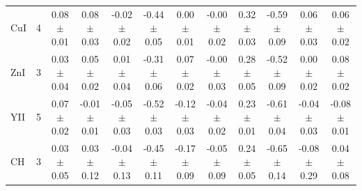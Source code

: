 \documentclass[oneside]{emulateapj}
\begin{document}
\begin{table}
\begin{tabular}{lccccccccccc}
CuI & 4 & 0.08 $\pm$ 0.01 & 0.08 $\pm$ 0.03 & -0.02 $\pm$ 0.02 & -0.44 $\pm$ 0.05 & 0.00 $\pm$ 0.01 & -0.00 $\pm$ 0.02 & 0.32 $\pm$ 0.03 & -0.59 $\pm$ 0.09 & 0.06 $\pm$ 0.03 & 0.06 $\pm$ 0.02 \\
ZnI & 3 & 0.03 $\pm$ 0.04 & 0.05 $\pm$ 0.02 & 0.01 $\pm$ 0.04 & -0.31 $\pm$ 0.06 & 0.07 $\pm$ 0.02 & -0.00 $\pm$ 0.03 & 0.28 $\pm$ 0.05 & -0.52 $\pm$ 0.09 & 0.00 $\pm$ 0.02 & 0.08 $\pm$ 0.02 \\
YII & 5 & 0.07 $\pm$ 0.02 & -0.01 $\pm$ 0.01 & -0.05 $\pm$ 0.03 & -0.52 $\pm$ 0.03 & -0.12 $\pm$ 0.03 & -0.04 $\pm$ 0.02 & 0.23 $\pm$ 0.01 & -0.61 $\pm$ 0.04 & -0.04 $\pm$ 0.03 & -0.08 $\pm$ 0.01 \\
CH & 3 & 0.03 $\pm$ 0.05 & 0.03 $\pm$ 0.12 & -0.04 $\pm$ 0.13 & -0.45 $\pm$ 0.11 & -0.17 $\pm$ 0.09 & -0.05 $\pm$ 0.09 & 0.24 $\pm$ 0.05 & -0.65 $\pm$ 0.14 & -0.08 $\pm$ 0.29 & 0.04 $\pm$ 0.08 \\
\hline       
\end{tabular}
\end{table}
\end{document}
